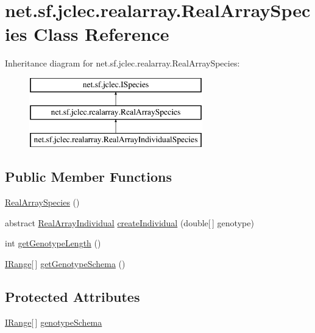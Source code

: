 \hypertarget{classnet_1_1sf_1_1jclec_1_1realarray_1_1_real_array_species}{\section{net.\-sf.\-jclec.\-realarray.\-Real\-Array\-Species Class Reference}
\label{classnet_1_1sf_1_1jclec_1_1realarray_1_1_real_array_species}
}
Inheritance diagram for net.\-sf.\-jclec.\-realarray.\-Real\-Array\-Species\-:\begin{figure}[H]
\begin{center}
\leavevmode
\includegraphics[height=3.000000cm]{classnet_1_1sf_1_1jclec_1_1realarray_1_1_real_array_species}
\end{center}
\end{figure}
\subsection*{Public Member Functions}
\begin{DoxyCompactItemize}
\item 
\hyperlink{classnet_1_1sf_1_1jclec_1_1realarray_1_1_real_array_species_a991b8004b99f149e1e17b64313fb2817}{Real\-Array\-Species} ()
\item 
abstract \hyperlink{classnet_1_1sf_1_1jclec_1_1realarray_1_1_real_array_individual}{Real\-Array\-Individual} \hyperlink{classnet_1_1sf_1_1jclec_1_1realarray_1_1_real_array_species_a99ad264b57f24b4f3723b4e8cab5dbb2}{create\-Individual} (double\mbox{[}$\,$\mbox{]} genotype)
\item 
int \hyperlink{classnet_1_1sf_1_1jclec_1_1realarray_1_1_real_array_species_a3bc5f25ac23dcb9535226f7731037393}{get\-Genotype\-Length} ()
\item 
\hyperlink{interfacenet_1_1sf_1_1jclec_1_1util_1_1range_1_1_i_range}{I\-Range}\mbox{[}$\,$\mbox{]} \hyperlink{classnet_1_1sf_1_1jclec_1_1realarray_1_1_real_array_species_a235140b906019c2dd9b986f90e55277e}{get\-Genotype\-Schema} ()
\end{DoxyCompactItemize}
\subsection*{Protected Attributes}
\begin{DoxyCompactItemize}
\item 
\hyperlink{interfacenet_1_1sf_1_1jclec_1_1util_1_1range_1_1_i_range}{I\-Range}\mbox{[}$\,$\mbox{]} \hyperlink{classnet_1_1sf_1_1jclec_1_1realarray_1_1_real_array_species_a97f34d721e8108eed41e9196ab9fdebf}{genotype\-Schema}
\end{DoxyCompactItemize}


